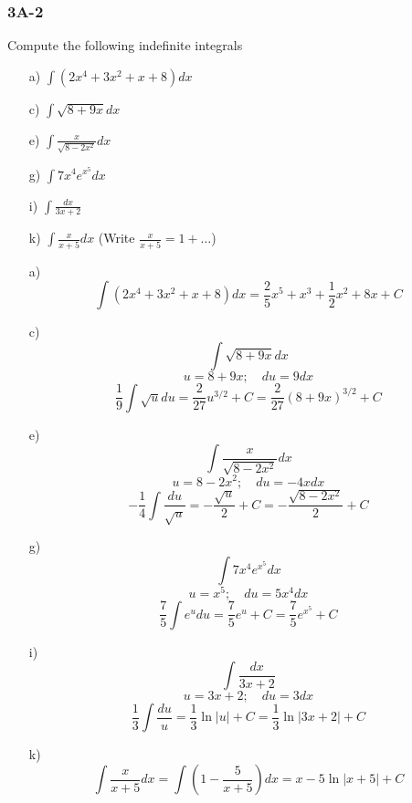 \documentclass{article}
\begin{document}
\subsubsection{3A-2}
\begin{tcolorbox}
    Compute the following indefinite integrals
    \begin{itemize}
        \item[a)] $\int{(2x^4+3x^2+x+8)dx}$
        \item[c)] $\int{\sqrt{8+9x}dx}$
        \item[e)] $\int{\frac{x}{\sqrt{8-2x^2}}dx}$
        \item[g)] $\int{7x^4e^{x^5}dx}$
        \item[i)] $\int{\frac{dx}{3x+2}}$
        \item[k)] $\int{\frac{x}{x+5}dx}$ (Write $\frac{x}{x+5} = 1 + \dots$)
    \end{itemize}
\end{tcolorbox}
\begin{itemize}
    
    \item[a)]
    \[ \int{(2x^4+3x^2+x+8)dx} = \frac{2}{5}x^5 + x^3 + \frac{1}{2}x^2 + 8x + C \]
    
    \item[c)]
    \[ \int{\sqrt{8+9x}dx} \]
    \[ u = 8 + 9x; \quad du = 9dx \]
    \[ \frac{1}{9}\int{\sqrt{u}du} = \frac{2}{27}u^{3/2} + C = \frac{2}{27}(8+9x)^{3/2} + C \]

    \item[e)]
    \[ \int{\frac{x}{\sqrt{8-2x^2}}dx} \]
    \[ u = 8-2x^2; \quad du = -4xdx \]
    \[ -\frac{1}{4}\int{\frac{du}{\sqrt{u}}} = -\frac{\sqrt{u}}{2} + C = -\frac{\sqrt{8-2x^2}}{2} + C \]

    \item[g)] 
    \[ \int{7x^4e^{x^5}dx} \]
    \[ u = x^5; \quad du = 5x^4dx \]
    \[ \frac{7}{5}\int{e^udu} = \frac{7}{5}e^u + C = \frac{7}{5}e^{x^5} + C \]

    \item[i)]
    \[ \int{\frac{dx}{3x+2}} \]
    \[  u = 3x+2; \quad du = 3dx \]
    \[ \frac{1}{3}\int{\frac{du}{u}} = \frac{1}{3} \ln{|u|} + C = \frac{1}{3} \ln{|3x+2|} + C \]

    \item[k)] 
    \[ \int{\frac{x}{x+5}dx} = \int{\left( 1 - \frac{5}{x+5} \right)dx} = x - 5\ln{|x+5|} + C \]
\end{itemize}
\end{document}
